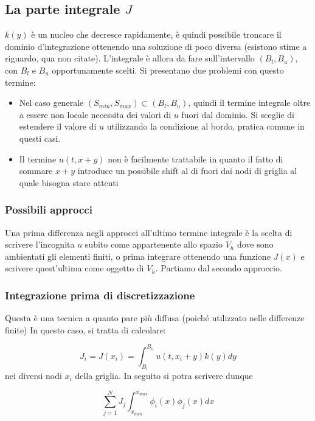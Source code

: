\documentclass[a4paper,10pt]{article}
\begin{document}
\subsection{La parte integrale $J$}

$k(y)$ è un nucleo che decresce rapidamente, è quindi possibile troncare il dominio d'integrazione ottenendo una soluzione di poco diversa (esistono stime a riguardo, qua non citate). L'integrale è allora da fare sull'intervallo $(B_l,B_u)$, con $B_l$ e $B_u$ opportunamente scelti. Si presentano due problemi con questo termine:

\begin{itemize}
 \item Nel caso generale $(S_{min},S_{max}) \subset (B_l,B_u)$, quindi il termine integrale oltre a essere non locale necessita dei valori di $u$ fuori dal dominio. Si sceglie di estendere il valore di $u$ utilizzando la condizione al bordo, pratica comune in questi casi.
 \item Il termine $u(t,x+y)$ non è facilmente trattabile in quanto il fatto di sommare $x+y$ introduce un possibile shift al di fuori dai nodi di griglia al quale bisogna stare attenti
\end{itemize}

\subsubsection{Possibili approcci}

Una prima differenza negli approcci all'ultimo termine integrale è la scelta di scrivere l'incognita $u$ subito come appartenente allo spazio $V_h$ dove sono ambientati gli elementi finiti, o prima integrare ottenendo una funzione $J(x)$ e scrivere quest'ultima come oggetto di $V_h$. Partiamo dal secondo approccio.

\subsubsection{Integrazione prima di discretizzazione}

Questa è una tecnica a quanto pare più diffusa (poiché utilizzato nelle differenze finite)
In questo caso, si tratta di calcolare: 

\begin{equation*}
 J_i=J(x_i)=\int_{B_l}^{B_u}u(t,x_i+y)k(y)dy
\end{equation*}
nei diversi nodi $x_i$ della griglia. In seguito si potra scrivere dunque 

\begin{equation*}
 \sum_{j=1}^N J_j\int_{x_{min}}^{x_{max}} \phi_i(x)\phi_j(x)dx
\end{equation*}
\end{document}
